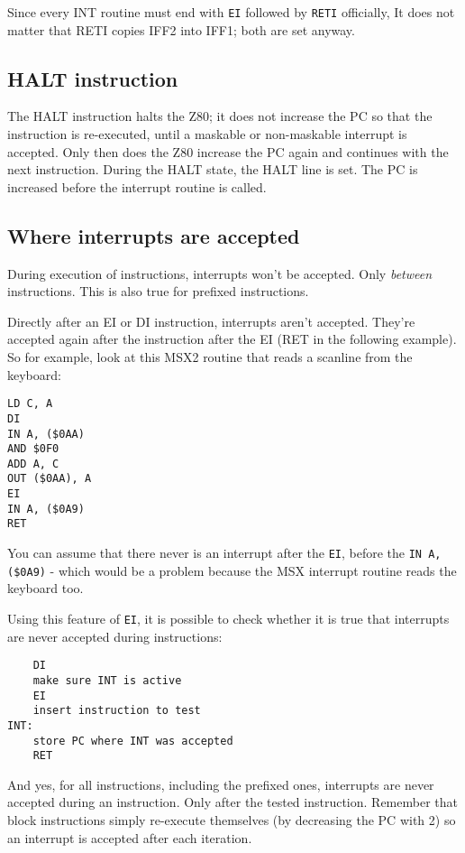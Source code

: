 \documentclass[12pt,twoside,openright,a4paper]{book}
\begin{document}
Since every INT routine must end with {\tt EI} followed by {\tt RETI} officially, It does not matter that RETI copies IFF2 into IFF1; both are set anyway.


\subsection{HALT instruction}

The HALT instruction halts the Z80; it does not increase the PC so that the instruction is re-executed, until a maskable or non-maskable interrupt is accepted. Only then does the Z80 increase the PC again and continues with the next instruction. During the HALT state, the HALT line is set. The PC is increased before the interrupt routine is called.


\pagebreak
\subsection{Where interrupts are accepted}

During execution of instructions, interrupts won't be accepted. Only {\em between} instructions. This is also true for prefixed instructions.

Directly after an EI or DI instruction, interrupts aren't accepted. They're accepted again after the instruction after the EI (RET in the following example). So for example, look at this MSX2 routine that reads a scanline from the keyboard:

\begin{Verbatim}
LD C, A
DI
IN A, ($0AA)
AND $0F0
ADD A, C
OUT ($0AA), A
EI
IN A, ($0A9)
RET
\end{Verbatim}

You can assume that there never is an interrupt after the {\tt EI}, before the {\tt IN A,(\$0A9)} - which would be a problem because the MSX interrupt routine reads the keyboard too.

Using this feature of {\tt EI}, it is possible to check whether it is true that interrupts are never accepted during instructions:

\begin{Verbatim}
	DI
	make sure INT is active
	EI
	insert instruction to test
INT:
	store PC where INT was accepted
	RET
\end{Verbatim}

And yes, for all instructions, including the prefixed ones, interrupts are never accepted during an instruction. Only after the tested instruction. Remember that block instructions simply re-execute themselves (by decreasing the PC with 2) so an interrupt is accepted after each iteration.
\end{document}
